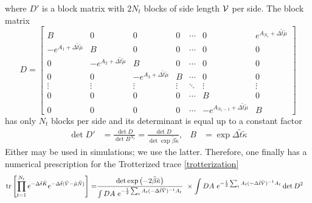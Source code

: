 where $D'$ is a block matrix with $2N_t$ blocks of side length $\mathcal{V}$ per side.
The block matrix
\begin{equation}
	D
	=
	\begin{bmatrix}
		B                                      & 0                                      & 0                                      & 0      & \cdots & 0                                            & e^{A_{N_t}+ \Delta \tilde{t} \tilde{\mu}}
	\\	-e^{A_1+ \Delta \tilde{t} \tilde{\mu}} & B                                      & 0                                      & 0      & \cdots & 0                                            & 0
	\\	0                                      & -e^{A_2+ \Delta \tilde{t} \tilde{\mu}} & B                                      & 0      & \cdots & 0                                            & 0
	\\	0                                      & 0                                      & -e^{A_3+ \Delta \tilde{t} \tilde{\mu}} & B      & \cdots & 0                                            & 0
	\\	\vdots                                 & \vdots                                 & \vdots                                 & \vdots & \ddots & \vdots                                       & \vdots
	\\	0                                      & 0                                      & 0                                      & 0      & \cdots & B                                            & 0
	\\	0                                      & 0                                      & 0                                      & 0      & \cdots & -e^{A_{N_t-1}+ \Delta \tilde{t} \tilde{\mu}} & B
	\end{bmatrix}
	\label{eq:fermion matrix}
\end{equation} 
has only $N_t$ blocks per side and its determinant is equal up to a constant factor
\begin{align}
	\det D' &= \frac{ \det D }{ \det B^{N_t} } = \frac{ \det D }{ \det \exp \tilde{\beta} \tilde{\kappa} },
	&
	B &= \exp \Delta\tilde{t} \tilde{\kappa}
\end{align}
Either may be used in simulations; we use the latter.
Therefore, one finally has a numerical prescription for the Trotterized trace \eqref{trotterization}
\begin{align}
	\text{tr}\left[ \prod_{t=1}^{N_t} e^{-\Delta \tilde{t}\tilde{K}}  e^{-\Delta \tilde{t} (\tilde{V} - \tilde{\mu}\tilde{N})}  \right]
	=&
	\frac{\det \exp\left( -2 \tilde{\beta}\tilde{\kappa}\right)}{ \int DA ~ e^{-\frac{1}{2} \sum_t A_t (-\Delta\tilde{t}\tilde{V})^{-1} A_t } } ~ \times
	\int DA ~ e^{-\frac{1}{2} \sum_t A_t (-\Delta\tilde{t}\tilde{V})^{-1} A_t } \det D^2
\end{align}
